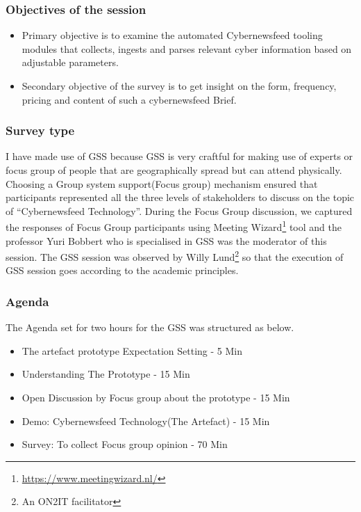 \subsubsection{Objectives of the session}
\begin{itemize}
    \item Primary objective is to examine the automated Cybernewsfeed tooling modules that collects,
ingests and parses relevant cyber information based on adjustable parameters.
    \item Secondary objective of the survey is to get insight on the form, frequency, pricing and content of such a cybernewsfeed Brief.
\end{itemize}

\subsubsection{Survey type}
I have made use of GSS because GSS is very craftful for making use of experts or focus group of people that are geographically spread but can attend physically. Choosing a Group system support(Focus group) mechanism ensured that participants represented all the three levels of stakeholders to discuss on the topic of \enquote{Cybernewsfeed Technology}. During the Focus Group discussion, we captured the responses of Focus Group participants using Meeting Wizard\footnote{\url{https://www.meetingwizard.nl/}} tool and the professor Yuri Bobbert who is specialised in GSS was the moderator of this session. The GSS session was observed by Willy Lund\footnote{An ON2IT facilitator} so that the execution of GSS session goes according to the academic principles. 

\subsubsection{Agenda}
The Agenda set for two hours for the GSS was structured as below.

\begin{itemize}
    \item The artefact prototype Expectation Setting - 5 Min
    \item Understanding The Prototype - 15 Min
    \item Open Discussion by Focus group about the prototype - 15 Min
    \item Demo: Cybernewsfeed Technology(The Artefact) - 15 Min
    \item Survey: To collect Focus group opinion - 70 Min
\end{itemize}

